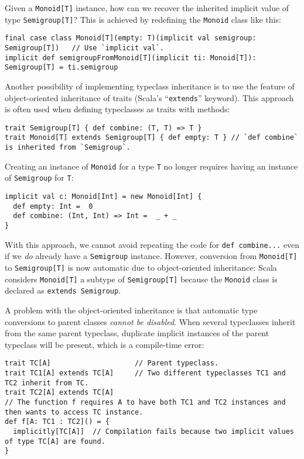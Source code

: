 Given a \lstinline!Monoid[T]! instance, how can we recover the inherited
implicit value of type \lstinline!Semigroup[T]!? This is achieved
by redefining the \lstinline!Monoid! class like this:
\begin{lstlisting}
final case class Monoid[T](empty: T)(implicit val semigroup: Semigroup[T])   // Use `implicit val`.
implicit def semigroupFromMonoid[T](implicit ti: Monoid[T]): Semigroup[T] = ti.semigroup
\end{lstlisting}

Another possibility of implementing typeclass inheritance is to use
the feature of object-oriented inheritance
of traits (Scala\textsf{'}s \textsf{``}\lstinline!extends!\textsf{''} keyword). This approach
is often used when defining typeclasses as traits with methods:
\begin{lstlisting}
trait Semigroup[T] { def combine: (T, T) => T }
trait Monoid[T] extends Semigroup[T] { def empty: T } // `def combine` is inherited from `Semigroup`.
\end{lstlisting}
Creating an instance of \lstinline!Monoid! for a type \lstinline!T!
no longer requires having an instance of \lstinline!Semigroup! for
\lstinline!T!:
\begin{lstlisting}
implicit val c: Monoid[Int] = new Monoid[Int] {
  def empty: Int =  0
  def combine: (Int, Int) => Int =  _ + _
}
\end{lstlisting}
With this approach, we cannot avoid repeating the code for \lstinline!def combine...!
even if we \emph{do} already have a \lstinline!Semigroup! instance.
However, conversion from \lstinline!Monoid[T]! to \lstinline!Semigroup[T]!
is now automatic due to object-oriented inheritance:
Scala considers \lstinline!Monoid[T]! a subtype of \lstinline!Semigroup[T]!
because the \lstinline!Monoid! class is declared as \lstinline!extends Semigroup!.

A problem with the object-oriented inheritance is that automatic type
conversions to parent classes \emph{cannot be disabled}. When several
typeclasses inherit from the same parent typeclass, duplicate implicit
instances of the parent typeclass will be present, which is a compile-time
error:
\begin{lstlisting}
trait TC[A]                    // Parent typeclass.
trait TC1[A] extends TC[A]     // Two different typeclasses TC1 and TC2 inherit from TC.
trait TC2[A] extends TC[A]
// The function f requires A to have both TC1 and TC2 instances and then wants to access TC instance.
def f[A: TC1 : TC2]() = {
  implicitly[TC[A]]  // Compilation fails because two implicit values of type TC[A] are found.
}
\end{lstlisting}

